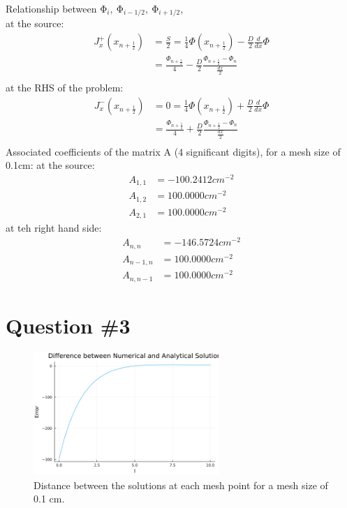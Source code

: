 \documentclass[11pt,a4paper]{article}
\begin{document}
Relationship between $\mathrm{\Phi}_i,\ \mathrm{\Phi}_{i-1/2},\ \mathrm{\Phi}_{i+1/2}$, \\
at the source:
\begin{align}
J_{x}^{+}\left( x_{n+\frac{1}{2}} \right) &= \frac{S}{2}  = \frac{1}{4}\Phi\left( x_{n+\frac{1}{2}} \right) - \frac{D}{2} \frac{d}{dx}\Phi  \\
        & = \frac{\Phi_{n+\frac{1}{2}}}{4}-\frac{D}{2} \frac{\Phi_{n+\frac{1}{2}}-\Phi_{n}}{\frac{dx}{2}} \\
\end{align}
at the RHS of the problem:
\begin{align}
    J_{x}^{-}\left( x_{n+\frac{1}{2}} \right) &= 0  = \frac{1}{4}\Phi\left( x_{n+\frac{1}{2}} \right) + \frac{D}{2} \frac{d}{dx}\Phi  \\
        & = \frac{\Phi_{n+\frac{1}{2}}}{4}+\frac{D}{2} \frac{\Phi_{n+\frac{1}{2}}-\Phi_{n}}{\frac{dx}{2}} \\
\end{align}
Associated coefficients of the matrix A (4 significant digits), for a mesh size of 0.1cm:
at the source:
\begin{align}
    A_{1, 1}     &= -100.2412 cm^{-2}\\
    A_{1, 2}     &=  100.0000 cm^{-2}\\
    A_{2, 1}     &=  100.0000 cm^{-2}
\end{align}
at teh right hand side:
\begin{align}
    A_{n, n}     &= -146.5724 cm^{-2}\\
    A_{n - 1, n} &=  100.0000 cm^{-2}\\
    A_{n, n - 1} &=  100.0000 cm^{-2}
\end{align}

\section{Question \#3}
\begin{figure}[h]
\includegraphics[width=7cm]{../figs/ex1_err_100.png}
\centering
\caption{Distance between the solutions at each mesh point for a mesh size of 0.1 cm.}
\end{figure}
\end{document}
